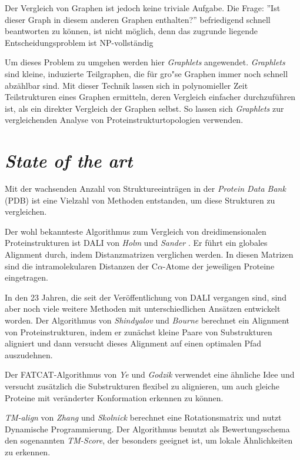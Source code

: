 \documentclass{report}
\begin{document}
Der Vergleich von Graphen ist jedoch keine triviale Aufgabe. Die Frage: ''Ist dieser Graph in diesem anderen Graphen enthalten?'' befriedigend schnell beantworten zu k\"onnen, ist nicht m\"oglich, denn das zugrunde liegende Entscheidungsproblem ist NP-vollst\"andig \cite{karp1972reducibility}

Um dieses Problem zu umgehen werden hier \textit{Graphlets} angewendet. \textit{Graphlets} sind kleine, induzierte Teilgraphen, die f\"ur gro"se Graphen immer noch schnell abz\"ahlbar sind. Mit dieser Technik lassen sich in polynomieller Zeit Teilstrukturen eines Graphen ermitteln, deren Vergleich einfacher durchzuf\"uhren ist, als ein direkter Vergleich der Graphen selbst. So lassen sich \textit{Graphlets} zur vergleichenden Analyse von Proteinstrukturtopologien verwenden.




\section{\textit{State of the art}}

Mit der wachsenden Anzahl von Struktureeintr\"agen in der \textit{Protein Data Bank} (PDB) ist eine Vielzahl von Methoden entstanden, um diese Strukturen zu vergleichen.

Der wohl bekannteste Algorithmus zum Vergleich von dreidimensionalen Proteinstrukturen ist DALI von \textit{Holm} und \textit{Sander} \cite{holm1993protein}. Er f\"uhrt ein globales Alignment durch, indem Distanzmatrizen verglichen werden. In diesen Matrizen sind die intramolekularen Distanzen der C$\alpha$-Atome der jeweiligen Proteine eingetragen.

In den 23 Jahren, die seit der Ver\"offentlichung von DALI vergangen sind, sind aber noch viele weitere Methoden mit unterschiedlichen Ans\"atzen entwickelt worden. Der Algorithmus von \textit{Shindyalov} und \textit{Bourne} \cite{shindyalov1998protein} berechnet ein Alignment von Proteinstrukturen, indem er zun\"achst kleine Paare von Substrukturen aligniert und dann versucht dieses Alignment auf einen optimalen Pfad auszudehnen.

Der FATCAT-Algorithmus von \textit{Ye} und \textit{Godzik} \cite{fatcat} verwendet eine \"ahnliche Idee und versucht zus\"atzlich die Substrukturen flexibel zu alignieren, um auch gleiche Proteine mit ver\"anderter Konformation erkennen zu k\"onnen.

\textit{TM-align} von \textit{Zhang} und \textit{Skolnick} \cite{zhangtm} berechnet eine Rotationsmatrix und nutzt Dynamische Programmierung. Der Algorithmus benutzt als Bewertungsschema den sogenannten \textit{TM-Score}, der besonders geeignet ist, um lokale \"Ahnlichkeiten zu erkennen.
\end{document}
